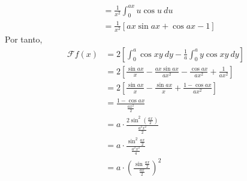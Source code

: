 \documentclass[12pt]{report}
\theoremstyle{largebreak}
\newcommand{\fou}[1]{\ensuremath{\mathcal{F}#1}}
\begin{document}
\begin{sol}
\begin{equation*}
\begin{split}
                &=\frac{1}{x^2}\int_0^{ax}u\cos u\:du\\
                &=\frac{1}{x^2}\left[ax\sin ax+\cos ax-1\right]
            \end{split}
        \end{equation*}
        Por tanto,
        \begin{equation*}
            \begin{split}
                \fou{f}(x)&=2\left[\int_{0}^a\cos xy\:dy-\frac{1}{a}\int_0^a y\cos xy\:dy\right]\\
                &=2\left[\frac{\sin ax}{x}-\frac{ax\sin ax}{ax^2}-\frac{\cos ax}{ax^2}+\frac{1}{ax^2}\right]\\
                &=2\left[\frac{\sin ax}{x}-\frac{\sin ax}{x}+\frac{1-\cos ax}{ax^2}\right]\\
                &=\frac{1-\cos ax}{\frac{ax^2}{2}}\\
                &=a\cdot\frac{2\sin^2\left(\frac{ax}{2}\right)}{\frac{a^2x^2}{2}}\\
                &=a\cdot\frac{\sin^2\frac{ax}{2}}{\frac{a^2x^2}{4}}\\
                &=a\cdot\left(\frac{\sin\frac{ax}{2}}{\frac{ax}{2}}\right)^2\\
            \end{split}
        \end{equation*}
        

\end{sol}
\end{document}
